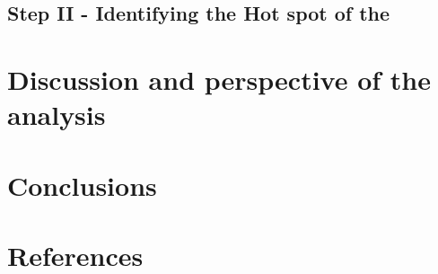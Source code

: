 \documentclass[
]{article}
\begin{document}
\hypertarget{step-ii---identifying-the-hot-spot-of-the}{%
\subsection{Step II - Identifying the Hot spot of the}\label{step-ii---identifying-the-hot-spot-of-the}}

\hypertarget{discussion-and-perspective-of-the-analysis}{%
\section{Discussion and perspective of the analysis}\label{discussion-and-perspective-of-the-analysis}}

\hypertarget{conclusions}{%
\section{Conclusions}\label{conclusions}}

\newpage

\hypertarget{references}{%
\section*{References}\label{references}}
\end{document}
